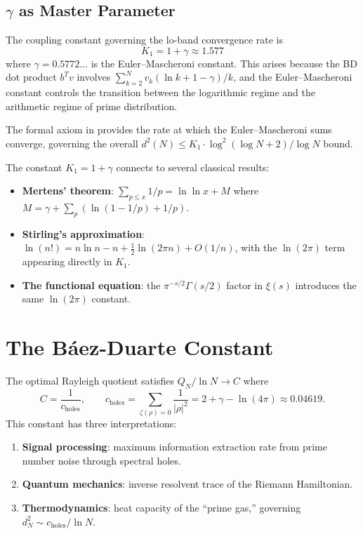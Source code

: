 \documentclass[11pt,a4paper]{article}
\begin{document}
\subsection{$\gamma$ as Master Parameter}

The coupling constant governing the lo-band convergence rate is
\[
  K_1 = 1 + \gamma \approx 1.577
\]
where $\gamma = 0.5772\ldots$ is the Euler--Mascheroni constant.
This arises because the BD dot product $b^T v$ involves
$\sum_{k=2}^{N} v_k (\ln k + 1 - \gamma)/k$, and the
Euler--Mascheroni constant controls the transition between
the logarithmic regime and the arithmetic regime of prime
distribution.

The formal axiom  in
provides the rate at which the Euler--Mascheroni sums
converge, governing the overall $d^2(N) \leq K_1 \cdot
\log^2(\log N + 2)/\log N$ bound.

\begin{remark}
The constant $K_1 = 1 + \gamma$ connects to
several classical results:
\begin{itemize}
  \item \textbf{Mertens' theorem}: $\sum_{p \leq x} 1/p =
    \ln\ln x + M$ where $M = \gamma + \sum_p (\ln(1-1/p) + 1/p)$.
  \item \textbf{Stirling's approximation}:
    $\ln(n!) = n\ln n - n + \tfrac{1}{2}\ln(2\pi n) + O(1/n)$,
    with the $\ln(2\pi)$ term appearing directly in $K_1$.
  \item \textbf{The functional equation}: the $\pi^{-s/2}
    \Gamma(s/2)$ factor in $\xi(s)$ introduces the same
    $\ln(2\pi)$ constant.
\end{itemize}
\end{remark}

\section{The B\'aez-Duarte Constant}
\label{sec:constant}

The optimal Rayleigh quotient satisfies $Q_N / \ln N \to C$ where
\[
  C = \frac{1}{c_{\mathrm{holes}}}, \qquad
  c_{\mathrm{holes}} = \sum_{\zeta(\rho)=0} \frac{1}{|\rho|^2}
  = 2 + \gamma - \ln(4\pi) \approx 0.04619.
\]
This constant has three interpretations:
\begin{enumerate}
  \item \textbf{Signal processing}: maximum information extraction
    rate from prime number noise through spectral holes.
  \item \textbf{Quantum mechanics}: inverse resolvent trace of
    the Riemann Hamiltonian.
  \item \textbf{Thermodynamics}: heat capacity of the ``prime gas,''
    governing $d_N^2 \sim c_{\mathrm{holes}}/\ln N$.
\end{enumerate}
\end{document}

